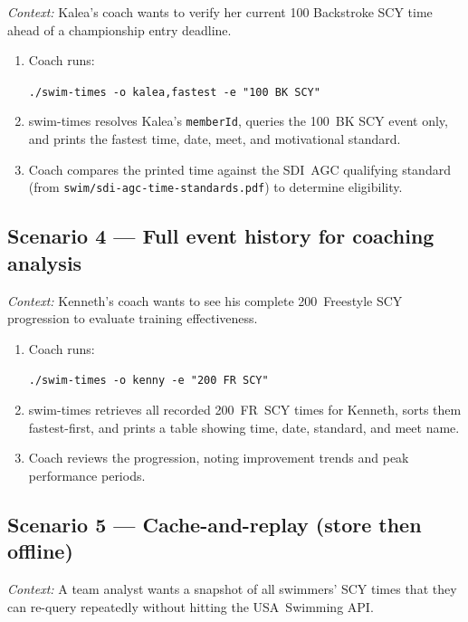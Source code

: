 \documentclass[12pt]{article}
\newcommand{\code}[1]{\texttt{#1}}
\begin{document}
\textit{Context:} Kalea's coach wants to verify her current
100 Backstroke SCY time ahead of a championship entry deadline.

\begin{enumerate}
  \item Coach runs:
        \begin{center}
          \code{./swim-times -o kalea,fastest -e "100 BK SCY"}
        \end{center}
  \item swim-times resolves Kalea's \code{memberId}, queries the
        100~BK SCY event only, and prints the fastest time,
        date, meet, and motivational standard.
  \item Coach compares the printed time against the SDI~AGC
        qualifying standard (from
        \code{swim/sdi-agc-time-standards.pdf}) to determine
        eligibility.
\end{enumerate}

\subsection{Scenario 4 --- Full event history for coaching analysis}

\textit{Context:} Kenneth's coach wants to see his complete
200~Freestyle SCY progression to evaluate training effectiveness.

\begin{enumerate}
  \item Coach runs:
        \begin{center}
          \code{./swim-times -o kenny -e "200 FR SCY"}
        \end{center}
  \item swim-times retrieves all recorded 200~FR~SCY times for
        Kenneth, sorts them fastest-first, and prints a table
        showing time, date, standard, and meet name.
  \item Coach reviews the progression, noting improvement trends
        and peak performance periods.
\end{enumerate}

\subsection{Scenario 5 --- Cache-and-replay (store then offline)}

\textit{Context:} A team analyst wants a snapshot of all
swimmers' SCY times that they can re-query repeatedly without
hitting the USA~Swimming API.
\end{document}
